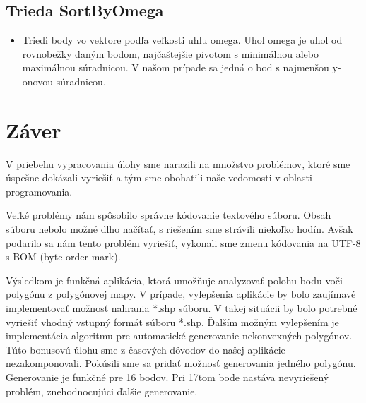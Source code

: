 \documentclass[12pt]{article}
\begin{document}
\subsection{Trieda SortByOmega}
\begin{itemize}
\item Triedi body vo vektore podľa veľkosti uhlu omega. Uhol omega je uhol od rovnobežky daným bodom, najčaštejšie pivotom s minimálnou alebo maximálnou súradnicou. V našom prípade sa jedná o bod s najmenšou y-onovou súradnicou.
\end{itemize}

\section{Záver}
V priebehu vypracovania úlohy sme narazili na množstvo problémov, ktoré sme úspešne dokázali vyriešiť a tým sme obohatili naše vedomosti v oblasti programovania.

Veľké problémy nám spôsobilo správne kódovanie textového súboru. Obsah súboru nebolo možné dlho načítať, s riešením sme strávili niekoľko hodín. Avšak podarilo sa nám tento problém vyriešiť, vykonali sme zmenu kódovania na UTF-8 s BOM (byte order mark).

Výsledkom je funkčná aplikácia, ktorá umožňuje analyzovať polohu bodu voči polygónu z polygónovej mapy. V prípade, vylepšenia aplikácie by bolo zaujímavé implementovať možnosť nahrania *.shp súboru. V takej situácii by bolo potrebné vyriešiť vhodný vstupný formát súboru *.shp. Ďalším možným vylepšením je implementácia algoritmu pre automatické generovanie nekonvexných polygónov. Túto bonusovú úlohu sme z časových dôvodov do našej aplikácie nezakomponovali. Pokúsili sme sa pridať možnosť generovania jedného polygónu. Generovanie je funkčné pre 16 bodov. Pri 17tom bode nastáva nevyriešený problém, znehodnocujúci ďalšie generovanie.
\nocite{*}
{}

    
\end{document}
